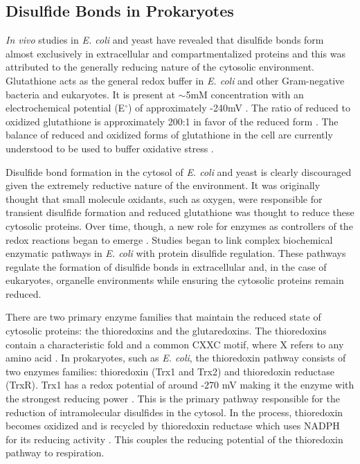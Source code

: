 \subsection{Disulfide Bonds in Prokaryotes}

\emph{In vivo} studies in \emph{E. coli} and yeast have revealed that disulfide
bonds form almost exclusively in extracellular and compartmentalized proteins
and this was attributed to the generally reducing nature of the cytosolic 
environment. Glutathione acts as the general redox buffer in \emph{E.  coli} and
other Gram-negative bacteria and eukaryotes. It is present at $\sim$5mM
concentration with an electrochemical potential (E$^\circ$) of approximately
-240mV \cite{30}.  The ratio of reduced to oxidized glutathione is
approximately 200:1 in favor of the reduced form \cite{19}.  The balance of
reduced and oxidized forms of glutathione in the cell are currently understood
to be used to buffer oxidative stress \cite{31}.  

Disulfide bond formation in the cytosol of \emph{E. coli} and yeast is
clearly discouraged given the extremely reductive nature of the environment.
It was originally thought that small molecule oxidants, such as oxygen, were
responsible for transient disulfide formation and reduced glutathione was
thought to reduce these cytosolic proteins.  Over time, though, a new role for
enzymes as controllers of the redox reactions began to emerge
\cite{11,144,12,13,14,15,16,17,18,19,20}.  Studies began to link complex
biochemical enzymatic pathways in \emph{E. coli} with protein disulfide
regulation.  These pathways regulate the formation of disulfide bonds in
extracellular and, in the case of eukaryotes, organelle environments while
ensuring the cytosolic proteins remain reduced.  


There are two primary enzyme families that maintain the reduced state of
cytosolic proteins: the thioredoxins and the glutaredoxins.  The thioredoxins
contain a characteristic fold and a common CXXC motif, where X refers to any
amino acid \cite{25,carvalho2005sad,26,27}.  In prokaryotes, such as \emph{E.
coli}, the thioredoxin pathway consists of two enzymes families: thioredoxin
(Trx1 and Trx2) and thioredoxin reductase (TrxR). Trx1 has a redox potential of
around -270 mV making it the enzyme with the strongest reducing power
\cite{11}. This is the primary pathway responsible for the reduction of
intramolecular disulfides in the cytosol.  In the process, thioredoxin becomes
oxidized and is recycled by thioredoxin reductase which uses NADPH for its
reducing activity \cite{41}.  This couples the reducing potential of the
thioredoxin pathway to respiration.

